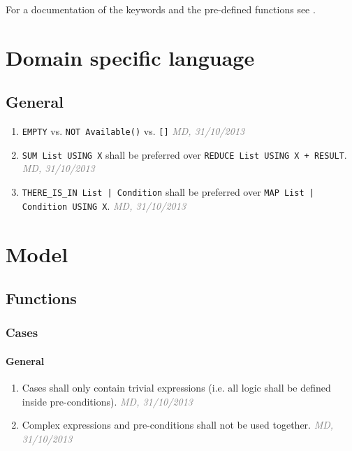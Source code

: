 \documentclass[draft, a4paper, oneside]{scrreprt}
\let\emph\textsl
\newcommand{\code}[1]{\lstinline$#1$}
\newcommand{\ruleauthor}[2]{\mbox{}\newline\mbox{}\hfill{\footnotesize\textcolor{gray}{\emph{#1, #2}}}\xspace}}
\newcommand{\ruleauthor}[2]{}
\begin{document}
For a documentation of the keywords and the pre-defined functions see \cite{efstechdesign}.



\chapter{Domain specific language}

\section{General}
\begin{enumerate}
\item {} \code{EMPTY} vs. \code{NOT Available()} vs. \code{[]} \ruleauthor{MD}{31/10/2013}
\item \code{SUM List USING X} shall be preferred over \code{REDUCE List USING X + RESULT}. \ruleauthor{MD}{31/10/2013}
\item \code{THERE_IS_IN List | Condition} shall be preferred over \code{MAP List | Condition USING X}. \ruleauthor{MD}{31/10/2013}
\end{enumerate}


\chapter{Model}

\section{Functions}
\subsection{Cases}

\subsubsection{General}
\begin{enumerate}
\item \label{rule:functions_cases_general_trivialexpressions} Cases shall only contain trivial expressions (i.e. all logic shall be defined inside pre-conditions). \ruleauthor{MD}{31/10/2013}
\item {} Complex expressions and pre-conditions shall not be used together.  \ruleauthor{MD}{31/10/2013}
\end{enumerate}
\end{document}
